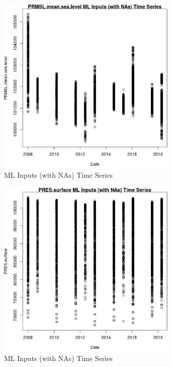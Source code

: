 \begin{figure} 
\centering  
\includegraphics[width=0.77\textwidth]{Code_Outputs/Report_ML_input_PM25_Step4_part_e_de_duplicated_aves_compiled_2019-05-18wNAs_PRMSLmeansealevelvDate.jpg} 
\caption{\label{fig:Report_ML_input_PM25_Step4_part_e_de_duplicated_aves_compiled_2019-05-18wNAsPRMSLmeansealevelvDate}ML Inputs (with NAs) Time Series} 
\end{figure} 
 

\begin{figure} 
\centering  
\includegraphics[width=0.77\textwidth]{Code_Outputs/Report_ML_input_PM25_Step4_part_e_de_duplicated_aves_compiled_2019-05-18wNAs_PRESsurfacevDate.jpg} 
\caption{\label{fig:Report_ML_input_PM25_Step4_part_e_de_duplicated_aves_compiled_2019-05-18wNAsPRESsurfacevDate}ML Inputs (with NAs) Time Series} 
\end{figure} 
 

